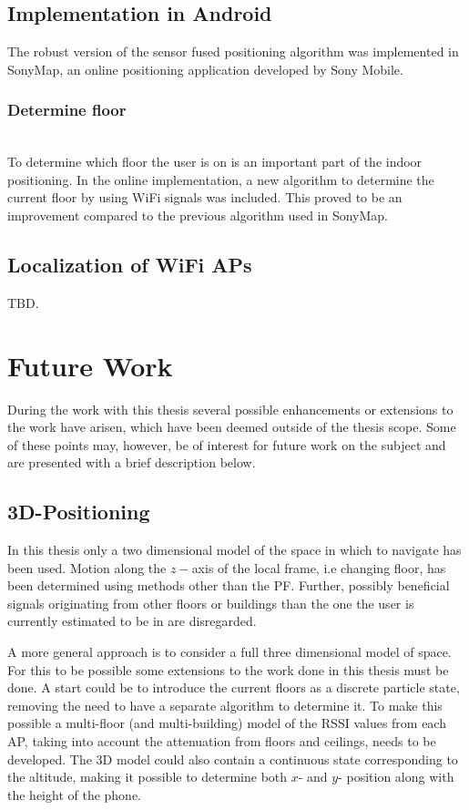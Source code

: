 \documentclass{LTHthesis}
\begin{document}
\subsection{Implementation in Android}
The robust version of the sensor fused positioning algorithm was implemented in SonyMap, an online positioning application developed by Sony Mobile.

\subsubsection{Determine floor} ~\\
To determine which floor the user is on is an important part of the indoor positioning. In the online implementation, a new algorithm to determine the current floor by using WiFi signals was included. This proved to be an improvement compared to the previous algorithm used in SonyMap.



\subsection{Localization of WiFi APs}
TBD.


\section{Future Work}
%
During the work with this thesis several possible enhancements or extensions to the work have arisen, which have been deemed outside of the thesis scope. Some of these points may, however, be of interest for future work on the subject and are presented with a brief description below. 
%
\subsection{3D-Positioning}
%
In this thesis only a two dimensional model of the space in which to navigate has been used. Motion along the $z-$axis of the local frame, i.e changing floor, has been determined using methods other than the PF. Further, possibly beneficial signals originating from other floors or buildings than the one the user is currently estimated to be in are disregarded.

A more general approach is to consider a full three dimensional model of space. For this to be possible some extensions to the work done in this thesis must be done. A start could be to introduce the current floors as a discrete particle state, removing the need to have a separate algorithm to determine it. To make this possible a multi-floor (and multi-building) model of the RSSI values from each AP, taking into account the attenuation from floors and ceilings, needs to be developed. The 3D model could also contain a continuous state corresponding to the altitude, making it possible to determine both $x$- and $y$- position along with the height of the phone. 
%
\end{document}
